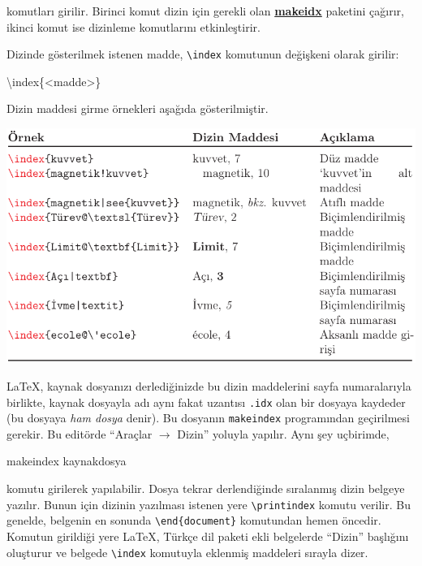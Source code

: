 \documentclass[
  letterpaper,
  DIV=11,
  numbers=noendperiod]{scrreprt}
\newenvironment{Shaded}{\begin{snugshade}}{\end{snugshade}}
\newcommand{\ExtensionTok}[1]{\textcolor[rgb]{0.00,0.23,0.31}{#1}}
\newcommand{\FunctionTok}[1]{\textcolor[rgb]{0.28,0.35,0.67}{#1}}
\newcommand{\NormalTok}[1]{\textcolor[rgb]{0.00,0.23,0.31}{#1}}
\begin{document}
komutları girilir. Birinci komut dizin için gerekli olan
\href{http://ftp.ntua.gr/mirror/ctan/macros/latex/base/makeindx.pdf}{\textbf{makeidx}}
paketini çağırır, ikinci komut ise dizinleme komutlarını etkinleştirir.

Dizinde gösterilmek istenen madde, \texttt{\textbackslash{}index}
komutunun değişkeni olarak girilir:

\begin{Shaded}
\begin{Highlighting}[]
\FunctionTok{\textbackslash{}index}\NormalTok{\{\textless{}madde\textgreater{}\}}
\end{Highlighting}
\end{Shaded}

Dizin maddesi girme örnekleri aşağıda gösterilmiştir.

\includegraphics{./images/dizina.png}

{\LaTeX}, kaynak dosyanızı derlediğinizde bu dizin maddelerini sayfa
numaralarıyla birlikte, kaynak dosyayla adı aynı fakat uzantısı
\texttt{.idx} olan bir dosyaya kaydeder (bu dosyaya \emph{ham dosya}
denir). Bu dosyanın \texttt{makeindex} programından geçirilmesi gerekir.
Bu editörde ``Araçlar \(\rightarrow\) Dizin'' yoluyla yapılır. Aynı şey
uçbirimde,

\begin{Shaded}
\begin{Highlighting}[]
\ExtensionTok{makeindex}\NormalTok{ kaynakdosya}
\end{Highlighting}
\end{Shaded}

komutu girilerek yapılabilir. Dosya tekrar derlendiğinde sıralanmış
dizin belgeye yazılır. Bunun için dizinin yazılması istenen yere
\texttt{\textbackslash{}printindex} komutu verilir. Bu genelde, belgenin
en sonunda \texttt{\textbackslash{}end\{document\}} komutundan hemen
öncedir. Komutun girildiği yere {\LaTeX}, Türkçe dil paketi ekli
belgelerde ``Dizin'' başlığını oluşturur ve belgede
\texttt{\textbackslash{}index} komutuyla eklenmiş maddeleri sırayla
dizer.
\end{document}
